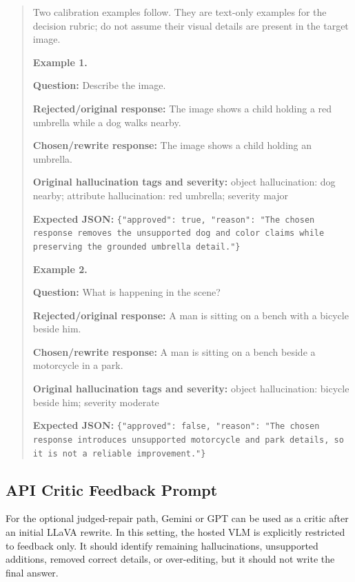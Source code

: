 \documentclass{article}
\begin{document}
\begin{quote}
\small
Two calibration examples follow. They are text-only examples for the decision rubric; do not assume their visual details are present in the target image.

\textbf{Example 1.}

\textbf{Question:}
Describe the image.

\textbf{Rejected/original response:}
The image shows a child holding a red umbrella while a dog walks nearby.

\textbf{Chosen/rewrite response:}
The image shows a child holding an umbrella.

\textbf{Original hallucination tags and severity:}
object hallucination: dog nearby; attribute hallucination: red umbrella; severity major

\textbf{Expected JSON:}
\texttt{\{"approved": true, "reason": "The chosen response removes the unsupported dog and color claims while preserving the grounded umbrella detail."\}}

\textbf{Example 2.}

\textbf{Question:}
What is happening in the scene?

\textbf{Rejected/original response:}
A man is sitting on a bench with a bicycle beside him.

\textbf{Chosen/rewrite response:}
A man is sitting on a bench beside a motorcycle in a park.

\textbf{Original hallucination tags and severity:}
object hallucination: bicycle beside him; severity moderate

\textbf{Expected JSON:}
\texttt{\{"approved": false, "reason": "The chosen response introduces unsupported motorcycle and park details, so it is not a reliable improvement."\}}
\end{quote}

\subsection{API Critic Feedback Prompt}
\label{app:api-critic-prompt}

For the optional judged-repair path, Gemini or GPT can be used as a critic after an initial LLaVA rewrite. In this setting, the hosted VLM is explicitly restricted to feedback only. It should identify remaining hallucinations, unsupported additions, removed correct details, or over-editing, but it should not write the final answer.
\end{document}
